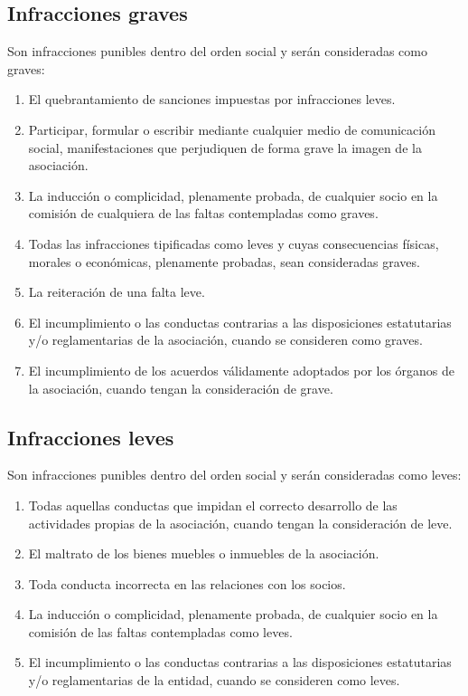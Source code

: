 \documentclass[a4paper, 12pt, oneside]{book}
\begin{document}
\subsection{Infracciones graves}

Son infracciones punibles dentro del orden social y serán consideradas como graves:

\begin{enumerate}
    \item El quebrantamiento de sanciones impuestas por infracciones leves.  
    \item Participar, formular o escribir mediante cualquier medio de comunicación social, manifestaciones que perjudiquen de forma grave la imagen de la asociación.  
    \item La inducción o complicidad, plenamente probada, de cualquier socio en la comisión de cualquiera de las faltas contempladas como graves.  
    \item Todas las infracciones tipificadas como leves y cuyas consecuencias físicas, morales o económicas, plenamente probadas, sean consideradas graves.  
    \item La reiteración de una falta leve.  
    \item El incumplimiento o las conductas contrarias a las disposiciones estatutarias y/o reglamentarias de la asociación, cuando se consideren como graves.  
    \item El incumplimiento de los acuerdos válidamente adoptados por los órganos de la asociación, cuando tengan la consideración de grave.
\end{enumerate}

\subsection{Infracciones leves}

Son infracciones punibles dentro del orden social y serán consideradas como leves:

\begin{enumerate}
    \item Todas aquellas conductas que impidan el correcto desarrollo de las actividades propias de la asociación, cuando tengan la consideración de leve.  
    \item El maltrato de los bienes muebles o inmuebles de la asociación.  
    \item Toda conducta incorrecta en las relaciones con los socios.  
    \item La inducción o complicidad, plenamente probada, de cualquier socio en la comisión de las faltas contempladas como leves.  
    \item El incumplimiento o las conductas contrarias a las disposiciones estatutarias y/o reglamentarias de la entidad, cuando se consideren como leves.
\end{enumerate}
\end{document}
